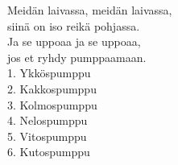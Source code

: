 
Meidän laivassa, meidän laivassa, \\ siinä on iso reikä pohjassa. \\ Ja se uppoaa ja se uppoaa, \\ jos et ryhdy pumppaamaan. \\ 1. Ykköspumppu \\ 2. Kakkospumppu \\ 3. Kolmospumppu \\ 4. Nelospumppu \\ 5. Vitospumppu \\ 6. Kutospumppu